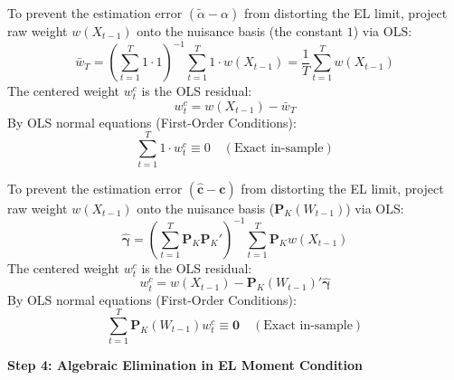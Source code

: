 \documentclass[11pt,landscape]{article}
\begin{document}
\noindent
\begin{minipage}[t]{0.48\textwidth}
To prevent the estimation error $(\widetilde{\alpha} - \alpha)$ from distorting the EL limit, project raw weight $w(X_{t-1})$ onto the nuisance basis (the constant $1$) via OLS:
\begin{equation}
    \bar{w}_T = \left( \sum_{t=1}^T 1 \cdot 1 \right)^{-1} \sum_{t=1}^T 1 \cdot w(X_{t-1}) = \frac{1}{T}\sum_{t=1}^T w(X_{t-1})
\end{equation}
The centered weight $w^c_t$ is the OLS residual:
\begin{equation}
    w^c_t = w(X_{t-1}) - \bar{w}_T
\end{equation}
By OLS normal equations (First-Order Conditions):
\begin{equation}
    \sum_{t=1}^T 1 \cdot w^c_t \equiv 0 \quad (\text{Exact in-sample})
\end{equation}
\end{minipage}%
\hfill
\begin{minipage}[t]{0.48\textwidth}
To prevent the estimation error $(\widehat{\bm{c}} - \bm{c})$ from distorting the EL limit, project raw weight $w(X_{t-1})$ onto the nuisance basis ($\bm{P}_K(W_{t-1})$) via OLS:
\begin{equation}
    \widehat{\bm{\gamma}} = \left( \sum_{t=1}^T \bm{P}_K \bm{P}_K' \right)^{-1} \sum_{t=1}^T \bm{P}_K w(X_{t-1})
\end{equation}
The centered weight $w^c_t$ is the OLS residual:
\begin{equation}
    w^c_t = w(X_{t-1}) - \bm{P}_K(W_{t-1})'\widehat{\bm{\gamma}}
\end{equation}
By OLS normal equations (First-Order Conditions):
\begin{equation}
    \sum_{t=1}^T \bm{P}_K(W_{t-1}) w^c_t \equiv \bm{0} \quad (\text{Exact in-sample})
\end{equation}
\end{minipage}

\vspace{1em}
\noindent\hrulefill
\vspace{1em}

\noindent\textbf{\large Step 4: Algebraic Elimination in EL Moment Condition} \vspace{0.5em}
\end{document}
